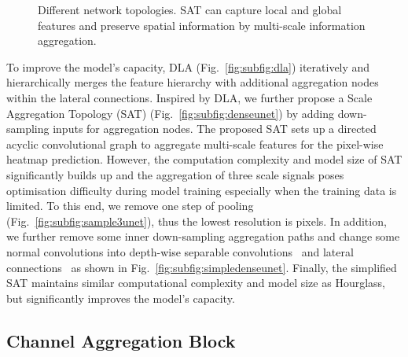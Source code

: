 \documentclass{bmvc2k}
\begin{document}
\begin{figure*}[ht!]
\centering
{}
\caption{Different network topologies. SAT can capture local and global features and preserve spatial information by multi-scale information aggregation.}
\vspace{-4mm}
\label{fig:nettopology}
\end{figure*}

To improve the model's capacity, DLA (Fig.~\ref{fig:subfig:dla}) iteratively and hierarchically merges the feature hierarchy with additional aggregation nodes within the lateral connections. Inspired by DLA, we further propose a Scale Aggregation Topology (SAT) (Fig.~\ref{fig:subfig:denseunet}) by adding down-sampling inputs for aggregation nodes. The proposed SAT sets up a directed acyclic convolutional graph to aggregate multi-scale features for the pixel-wise heatmap prediction. However, the computation complexity and model size of SAT significantly builds up and the aggregation of three scale signals poses optimisation difficulty during model training especially when the training data is limited. To this end, we remove one step of pooling (Fig.~\ref{fig:subfig:sample3unet}), thus the lowest resolution is  pixels. In addition, we further remove some inner down-sampling aggregation paths and change some normal convolutions into depth-wise separable convolutions~\cite{howard2017mobilenets} and lateral connections~\cite{ronneberger2015u} as shown in Fig.~\ref{fig:subfig:simpledenseunet}. Finally, the simplified SAT maintains similar computational complexity and model size as Hourglass, but significantly improves the model's capacity.

\subsection{Channel Aggregation Block}
\end{document}
